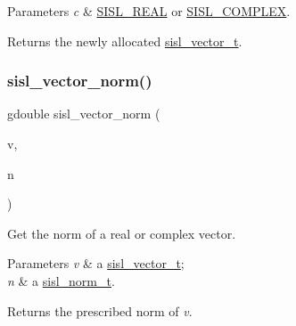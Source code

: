 \begin{DoxyParams}{Parameters}
{\em c} & \mbox{\hyperlink{group__vector_ggadbf341f8965fc86dda28912ab5f04930a6ce362b7ee267dd0b8c7e71414ddd06a}{S\+I\+S\+L\+\_\+\+R\+E\+AL}} or \mbox{\hyperlink{group__vector_ggadbf341f8965fc86dda28912ab5f04930a63110b4109e9db93c603d1070f44ca89}{S\+I\+S\+L\+\_\+\+C\+O\+M\+P\+L\+EX}}.\\
\hline
\end{DoxyParams}
\begin{DoxyReturn}{Returns}
the newly allocated \mbox{\hyperlink{group__vector_gacbac585492f5005f05f0c0b8463039be}{sisl\+\_\+vector\+\_\+t}}. 
\end{DoxyReturn}
\mbox{\label{group__vector_ga8275033791c371c8d30bf0abbb05f44a}} 
\subsubsection{\texorpdfstring{sisl\+\_\+vector\+\_\+norm()}{sisl\_vector\_norm()}}
{\footnotesize\ttfamily gdouble sisl\+\_\+vector\+\_\+norm (\begin{DoxyParamCaption}\item[{\mbox{\hyperlink{group__vector_gacbac585492f5005f05f0c0b8463039be}{sisl\+\_\+vector\+\_\+t}} $\ast$}]{v,  }\item[{\mbox{\hyperlink{group__vector_gaea7a49b9a1aa9a12bb021ada62a55495}{sisl\+\_\+norm\+\_\+t}}}]{n }\end{DoxyParamCaption})}

Get the norm of a real or complex vector.


\begin{DoxyParams}{Parameters}
{\em v} & a \mbox{\hyperlink{group__vector_gacbac585492f5005f05f0c0b8463039be}{sisl\+\_\+vector\+\_\+t}}; \\
\hline
{\em n} & a \mbox{\hyperlink{group__vector_gaea7a49b9a1aa9a12bb021ada62a55495}{sisl\+\_\+norm\+\_\+t}}.\\
\hline
\end{DoxyParams}
\begin{DoxyReturn}{Returns}
the prescribed norm of {\itshape v}. 
\end{DoxyReturn}
\mbox{\label{group__vector_gae10dd87e1006defb6e54392f8ef9e1e5}} 
